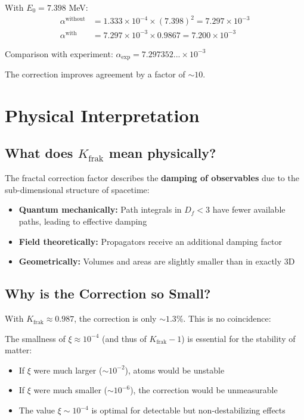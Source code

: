 	With $E_0 = 7.398$ MeV:
	\begin{align}
		\alpha^{\text{without}} &= 1.333 \times 10^{-4} \times (7.398)^2 = 7.297 \times 10^{-3} \\
		\alpha^{\text{with}} &= 7.297 \times 10^{-3} \times 0.9867 = 7.200 \times 10^{-3}
	\end{align}
	
	Comparison with experiment: $\alpha_{\text{exp}} = 7.297352... \times 10^{-3}$
	
	The correction improves agreement by a factor of $\sim 10$.
	
	\section{Physical Interpretation}
	
	\subsection{What does $K_{\text{frak}}$ mean physically?}
	
	The fractal correction factor describes the \textbf{damping of observables} due to the sub-dimensional structure of spacetime:
	
	\begin{itemize}
		\item \textbf{Quantum mechanically:} Path integrals in $D_f < 3$ have fewer available paths, leading to effective damping
		\item \textbf{Field theoretically:} Propagators receive an additional damping factor
		\item \textbf{Geometrically:} Volumes and areas are slightly smaller than in exactly 3D
	\end{itemize}
	
	\subsection{Why is the Correction so Small?}
	
	With $K_{\text{frak}} \approx 0.987$, the correction is only $\sim 1.3\%$. This is no coincidence:
	
	\begin{tcolorbox}[colback=blue!5!white,colframe=blue!75!black,title={Fine-Tuning of Nature}]
		The smallness of $\xi \approx 10^{-4}$ (and thus of $K_{\text{frak}} - 1$) is essential for the stability of matter:
		
		\begin{itemize}
			\item If $\xi$ were much larger ($\sim 10^{-2}$), atoms would be unstable
			\item If $\xi$ were much smaller ($\sim 10^{-6}$), the correction would be unmeasurable
			\item The value $\xi \sim 10^{-4}$ is optimal for detectable but non-destabilizing effects
		\end{itemize}
	\end{tcolorbox}
	
